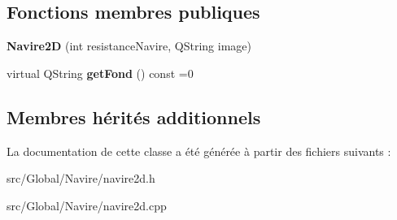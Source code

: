 \subsection*{Fonctions membres publiques}
\begin{DoxyCompactItemize}
\item 
{\bfseries Navire2D} (int resistance\+Navire, Q\+String image)\hypertarget{class_navire2_d_a7df7551c7b0833c6d78303347e371c46}{}\label{class_navire2_d_a7df7551c7b0833c6d78303347e371c46}

\item 
virtual Q\+String {\bfseries get\+Fond} () const  =0\hypertarget{class_navire2_d_a9c296afbbff06abc2f6caded7e2f8559}{}\label{class_navire2_d_a9c296afbbff06abc2f6caded7e2f8559}

\end{DoxyCompactItemize}
\subsection*{Membres hérités additionnels}


La documentation de cette classe a été générée à partir des fichiers suivants \+:\begin{DoxyCompactItemize}
\item 
src/\+Global/\+Navire/navire2d.\+h\item 
src/\+Global/\+Navire/navire2d.\+cpp\end{DoxyCompactItemize}

